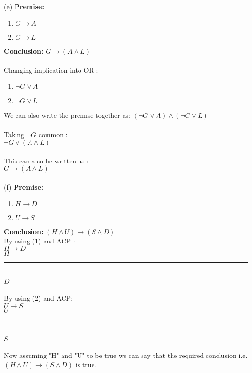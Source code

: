 \documentclass{article}
\begin{document}
(e) \textbf{Premise:} \\
\begin{enumerate}
    \item $G \rightarrow A$
    \item $G \rightarrow L$
    \end{enumerate}
\textbf{Conclusion:} 
$G \rightarrow (A \wedge L)$ \\
\\
Changing implication into OR : \\
\begin{enumerate}
    \item $\neg G \vee A$
    \item $\neg G \vee L$
    \end{enumerate}
We can also write the premise together as: 
 $(\neg G \vee A) \wedge (\neg G \vee L)$\\
 \\
 Taking $ \neg G $ common : \\
 $ \neg G \vee (A \wedge L)$\\
 \\
 This can also be written as : \\
 $G \rightarrow (A \wedge L)$ \\
 \\
(f) \textbf{Premise:} \\
\begin{enumerate}
    \item $H \rightarrow D$
    \item $U \rightarrow S$
    \end{enumerate}
    \textbf{Conclusion:}
    $(H \wedge U) \rightarrow (S \wedge D)$ \\
By using (1) and ACP :\\
 $H \rightarrow D$ \\
 $H$ \\
 \noindent\rule{1.9cm}{0.4pt}\\
 $ D $ \\
 \\
 By using (2) and ACP: \\
 $U \rightarrow S$ \\
 $U$ \\
 \noindent\rule{1.9cm}{0.4pt}\\
 $S$ \\
 \\
 Now assuming "H" and "U" to be true we can say that the required conclusion i.e. $(H \wedge U) \rightarrow (S \wedge D)$ is true.
 
\end{document}
